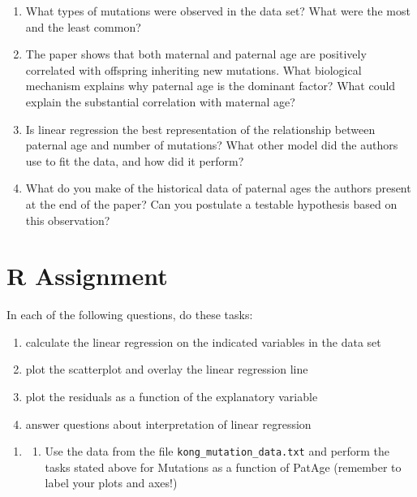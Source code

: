 \documentclass[
]{book}
\providecommand{\tightlist}{%
  \setlength{\itemsep}{0pt}\setlength{\parskip}{0pt}}
\theoremstyle{definition}
\theoremstyle{definition}
\theoremstyle{definition}
\theoremstyle{remark}
\begin{document}
\begin{enumerate}
\def\labelenumi{\arabic{enumi}.}
\item
  What types of mutations were observed in the data set? What were the most and the least common?
\item
  The paper shows that both maternal and paternal age are positively correlated with offspring inheriting new mutations. What biological mechanism explains why paternal age is the dominant factor? What could explain the substantial correlation with maternal age?
\item
  Is linear regression the best representation of the relationship between paternal age and number of mutations? What other model did the authors use to fit the data, and how did it perform?
\item
  What do you make of the historical data of paternal ages the authors present at the end of the paper? Can you postulate a testable hypothesis based on this observation?
\end{enumerate}

\hypertarget{r-assignment-3}{%
\section{R Assignment}\label{r-assignment-3}}

In each of the following questions, do these tasks:

\begin{enumerate}
\def\labelenumi{\arabic{enumi})}
\tightlist
\item
  calculate the linear regression on the indicated variables in the data set
\item
  plot the scatterplot and overlay the linear regression line
\item
  plot the residuals as a function of the explanatory variable
\item
  answer questions about interpretation of linear regression
\end{enumerate}

\begin{enumerate}
\def\labelenumi{\arabic{enumi}.}
\item
  \begin{enumerate}
  \def\labelenumii{\alph{enumii})}
  \tightlist
  \item
    Use the data from the file \texttt{kong\_mutation\_data.txt} and perform the tasks stated above for Mutations as a function of PatAge (remember to label your plots and axes!)
  \end{enumerate}
\end{enumerate}
\end{document}
